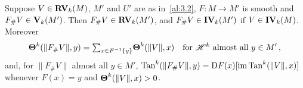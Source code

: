 \begin{theorem}
    \label{al:3.5(3)}
    Suppose $V \in \mathbf{RV}_{k}(M)$, $M'$ and $U'$ are as in~\ref{al:3.2}, $F : M \to M'$ is
    smooth and $F_\# V \in \mathbf{V}_{k}(M')$. Then $F_\# V \in \mathbf{RV}_{k}(M')$, and $F_\# V \in
    \mathbf{IV}_{k}(M')$ if $V \in \mathbf{IV}_{k}(M)$. Moreover
    \begin{displaymath}
        \boldsymbol{\Theta}^{k}(\|F_\# V\|, y) = {\textstyle\sum_{x \in F^{-1}\{y\}}^{}} \boldsymbol{\Theta}^{k}(\|V\|,x)
        \quad \text{for $\mathscr{H}^{k}$ almost all $y \in M'$} \,,
    \end{displaymath}
    and, for $\|F_\# V\|$ almost all $y \in M'$, $\operatorname{Tan}^{k}(\|F_\# V\|,y) = \mathrm{D} F(x)[\operatorname{im}
    \operatorname{Tan}^{k}(\|V\|,x)]$ whenever $F(x) = y$ and $\boldsymbol{\Theta}^{k}(\|V\|,x) > 0$.
\end{theorem}

